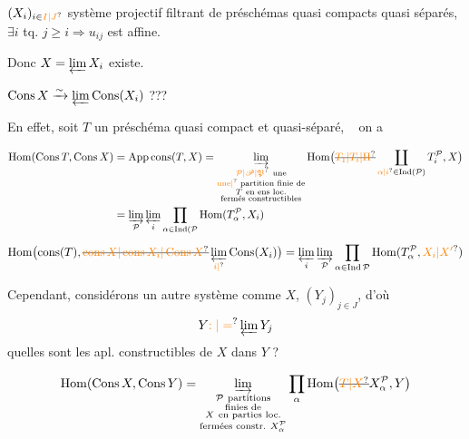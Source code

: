 
$(X_i)_{i\in\unsure{I|J}}$ système projectif filtrant de préschémas quasi compacts quasi séparés, $\exists i$ tq. $j\geq i\Rightarrow u_{ij}$ est affine.

Donc $X=\varprojlim X_i$ existe.

 $\operatorname{Cons}X\xrightarrow{\sim}\varprojlim\operatorname{Cons}(X_i)$ ???

En effet, soit $T$ un préschéma quasi compact et quasi-séparé, \  on a

{\scriptsize
\[
\begin{aligned}
\operatorname{Hom}(\operatorname{Cons}T,\operatorname{Cons}X)
&=\operatorname{App}\operatorname{cons}(T,X)=
\varinjlim_{\substack{\unsure{\mathcal P|\mathscr P|\mathfrak P}\ \text{une}\\\text{\unsure{une|{}} partition finie de}\\T\ \text{en ens loc.}\\\text{fermés constructibles}}}
\operatorname{Hom}\bigl(\deleted{\unsure{T_1|T_i|\Pi}}\coprod_{\unsure{\alpha|i}\in\mathrm{Ind}(\mathcal P)}T_i^{\mathcal P},X\bigr)\\
&=\varinjlim_{\mathcal P}\varprojlim_i\prod_{\alpha\in\mathrm{Ind}(\mathcal P}
\operatorname{Hom}(T_\alpha^{\mathcal P},X_i)
\end{aligned}
\]
\[
\operatorname{Hom}\bigl(\operatorname{cons}(T),\deleted{\unsure{\operatorname{cons}X|\operatorname{cons}X_i|\operatorname{Cons}X}}\varprojlim_{\unsure{i|{}}}\operatorname{Cons}(X_i)\bigr)
=\varprojlim_i\varinjlim_{\mathcal P}\prod_{\alpha\in\mathrm{Ind}\,\mathcal P}\operatorname{Hom}(T_\alpha^{\mathcal P},\unsure{X_i|X'})
\]
}

Cependant, considérons un autre système comme $X$,  $(Y_j)_{j\in J}$, d'où
\[
Y\unsure{:|=}\varprojlim Y_j
\]
quelles sont les  apl. constructibles de $X$ dans $Y$ ?  

\[
\operatorname{Hom}(\operatorname{Cons}X,\operatorname{Cons}Y)=
\varinjlim_{\substack{\mathcal P\ \text{partitions}\\\text{finies de}\\X\ \text{en parties loc.}\\\text{fermées constr.}\ X_\alpha^{\mathcal P}}}
\prod_\alpha\operatorname{Hom}\bigl(\deleted{\unsure{T|X}}X_\alpha^{\mathcal P},Y\bigr)
\]

